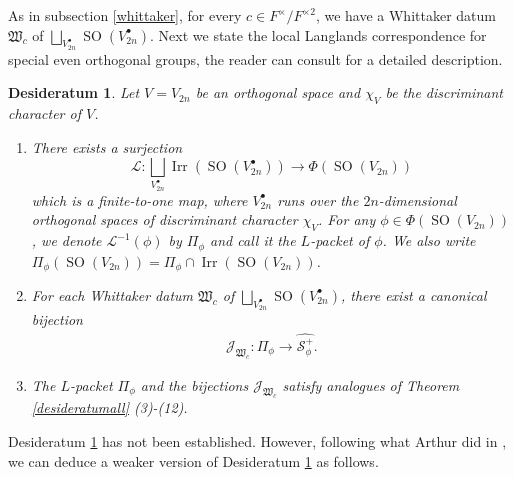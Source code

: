 \documentclass[article]{article}
\numberwithin{equation}{section}
\newtheorem{desideratum}[theorem]{Desideratum}
\theoremstyle{definition}
\DeclareMathOperator{\SO}{SO}
\DeclareMathOperator{\Irr}{Irr}
\begin{document}
As in subsection \ref{whittaker}, for every $c\in F^\times/F^{\times 2}$, we have a Whittaker datum $\mathfrak W_{c}$ of $\bigsqcup_{V_{2n}^{\bullet}}\SO(V_{2n}^{\bullet})$. Next we state the local Langlands correspondence for special even orthogonal groups, the reader can consult \cite[\S 3.3]{MR3708200} for a detailed description. 
\begin{desideratum}\label{desideratumallspecial1}
	Let $V=V_{2n}$ be an orthogonal space and $\chi_V$ be the discriminant character of $V$.
	\begin{enumerate}[(1).]
		\item There exists a surjection
		$$
		\mathcal L: \bigsqcup_{V_{2n}^{\bullet}} \Irr \left(\SO(V_{2n}^\bullet)\right) \longrightarrow \Phi(\SO(V_{2n}))$$
		which is a finite-to-one map, where $V_{2n}^{\bullet}$ runs over the $2n$-dimensional orthogonal spaces of discriminant character $\chi_V$. For any $\phi \in \Phi(\SO(V_{2n}))$, we denote $\mathcal L^{-1}(\phi)$ by $\Pi_{\phi}$ and call it the $L$-packet of $\phi$. We also write $\Pi_{\phi}(\SO(V_{2n}))=\Pi_{\phi}\cap \Irr\left(\SO(V_{2n})\right)$.
		\item For each Whittaker datum $\mathfrak W_{c}$ of $\bigsqcup_{V_{2n}^{\bullet}}\SO(V_{2n}^{\bullet})$, there exist a canonical bijection
		\begin{align}\label{522}
		\mathcal J_{\mathfrak W_{c}} : \Pi_{\phi} \longrightarrow \widehat {\mathcal S^+_{\phi}}.
		\end{align}
		\item The $L$-packet $\Pi_{\phi}$ and the bijections $\mathcal J_{\mathfrak W_{c}}$ satisfy analogues of Theorem \ref{desideratumall} (3)-(12). 
	\end{enumerate}
\end{desideratum}
Desideratum \ref{desideratumallspecial1} has not been established. However, following what Arthur did in \cite{MR3135650}, we can deduce a weaker version of Desideratum \ref{desideratumallspecial1} as follows. 
\end{document}
